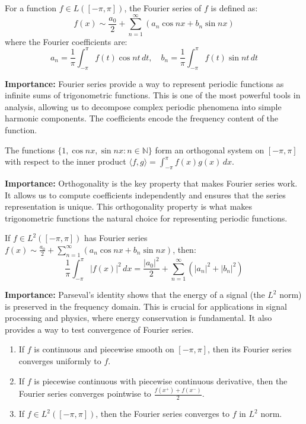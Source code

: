 \begin{definition}
For a function $f \in L([-\pi, \pi])$, the Fourier series of $f$ is defined as:
\[f(x) \sim \frac{a_0}{2} + \sum_{n=1}^{\infty} (a_n \cos nx + b_n \sin nx)\]
where the Fourier coefficients are:
\[a_n = \frac{1}{\pi} \int_{-\pi}^{\pi} f(t) \cos nt \, dt, \quad b_n = \frac{1}{\pi} \int_{-\pi}^{\pi} f(t) \sin nt \, dt\]
\end{definition}

\noindent\textbf{Importance:} Fourier series provide a way to represent periodic functions as infinite sums of trigonometric functions. This is one of the most powerful tools in analysis, allowing us to decompose complex periodic phenomena into simple harmonic components. The coefficients encode the frequency content of the function.



\begin{definition}
The functions $\{1, \cos nx, \sin nx : n \in \mathbb{N}\}$ form an orthogonal system on $[-\pi, \pi]$ with respect to the inner product $\langle f, g \rangle = \int_{-\pi}^{\pi} f(x) g(x) \, dx$.
\end{definition}

\noindent\textbf{Importance:} Orthogonality is the key property that makes Fourier series work. It allows us to compute coefficients independently and ensures that the series representation is unique. This orthogonality property is what makes trigonometric functions the natural choice for representing periodic functions.



\begin{theorem}
If $f \in L^2([-\pi, \pi])$ has Fourier series $f(x) \sim \frac{a_0}{2} + \sum_{n=1}^{\infty} (a_n \cos nx + b_n \sin nx)$, then:
\[\frac{1}{\pi} \int_{-\pi}^{\pi} |f(x)|^2 \, dx = \frac{|a_0|^2}{2} + \sum_{n=1}^{\infty} (|a_n|^2 + |b_n|^2)\]
\end{theorem}

\noindent\textbf{Importance:} Parseval's identity shows that the energy of a signal (the $L^2$ norm) is preserved in the frequency domain. This is crucial for applications in signal processing and physics, where energy conservation is fundamental. It also provides a way to test convergence of Fourier series.



\begin{theorem}
\begin{enumerate}[label=(\alph*)]
\item If $f$ is continuous and piecewise smooth on $[-\pi, \pi]$, then its Fourier series converges uniformly to $f$.
\item If $f$ is piecewise continuous with piecewise continuous derivative, then the Fourier series converges pointwise to $\frac{f(x^+) + f(x^-)}{2}$.
\item If $f \in L^2([-\pi, \pi])$, then the Fourier series converges to $f$ in $L^2$ norm.
\end{enumerate}
\end{theorem}

